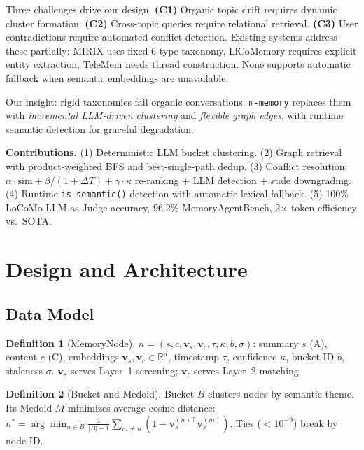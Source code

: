 \documentclass{article}
\theoremstyle{plain}\newtheorem{theorem}{Theorem}[section]
\theoremstyle{definition}\newtheorem{definition}[theorem]{Definition}
\newcommand{\mmemory}{\texttt{m-memory}\xspace}
\newcommand{\MAB}{MemoryAgentBench\xspace}
\begin{document}
Three challenges drive our design. \textbf{(C1)} Organic topic drift requires
dynamic cluster formation. \textbf{(C2)} Cross-topic queries require relational
retrieval. \textbf{(C3)} User contradictions require automated conflict detection.
Existing systems address these partially: MIRIX uses fixed 6-type taxonomy,
LiCoMemory requires explicit entity extraction, TeleMem needs thread construction.
None supports automatic fallback when semantic embeddings are unavailable.

Our insight: rigid taxonomies fail organic conversations. \mmemory{} replaces them
with \textit{incremental LLM-driven clustering} and \textit{flexible graph edges},
with runtime semantic detection for graceful degradation.

\textbf{Contributions.} (1) Deterministic LLM bucket clustering. (2) Graph retrieval
with product-weighted BFS and best-single-path dedup. (3) Conflict resolution:
$\alpha\cdot\text{sim}+\beta/(1+\Delta T)+\gamma\cdot\kappa$ re-ranking + LLM
detection + stale downgrading. (4) Runtime \texttt{is\_semantic()} detection with
automatic lexical fallback. (5) 100\% LoCoMo LLM-as-Judge accuracy, 96.2\% \MAB{},
2$\times$ token efficiency vs.\ SOTA.

\section{Design and Architecture}

\subsection{Data Model}

\begin{definition}[MemoryNode]
$n = (s, c, \mathbf{v}_s, \mathbf{v}_c, \tau, \kappa, b, \sigma)$: summary $s$ (A),
content $c$ (C), embeddings $\mathbf{v}_s,\mathbf{v}_c \in \mathbb{R}^d$, timestamp
$\tau$, confidence $\kappa$, bucket ID $b$, staleness $\sigma$. $\mathbf{v}_s$ serves
Layer~1 screening; $\mathbf{v}_c$ serves Layer~2 matching.
\end{definition}

\begin{definition}[Bucket and Medoid]
Bucket $B$ clusters nodes by semantic theme. Its Medoid $M$ minimizes average cosine
distance: $n^* = \arg\min_{n \in B} \frac{1}{|B|-1}\sum_{m \neq n}(1 -
\mathbf{v}_s^{(n)\top}\mathbf{v}_s^{(m)})$. Ties ($<10^{-9}$) break by node-ID.
\end{definition}
\end{document}
